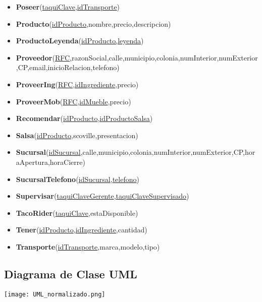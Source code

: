 \documentclass[11pt,letterpaper]{article}
\begin{document}
\begin{itemize}
\item \footnotesize{\textbf{Poseer}(\underline{taquiClave},\underline{idTransporte})}
\item \footnotesize{\textbf{Producto}(\underline{idProducto},nombre,precio,descripcion)}
\item \footnotesize{\textbf{ProductoLeyenda}(\underline{idProducto,leyenda})}
\item \scriptsize{\textbf{Proveedor}(\underline{RFC},razonSocial,calle,municipio,colonia,numInterior,numExterior,CP,email,inicioRelacion,telefono)}
\item \footnotesize{\textbf{ProveerIng}(\underline{RFC},\underline{idIngrediente},precio)}
\item \footnotesize{\textbf{ProveerMob}(\underline{RFC},\underline{idMueble},precio)}
\item \footnotesize{\textbf{Recomendar}(\underline{idProducto},\underline{idProductoSalsa})}
\item \footnotesize{\textbf{Salsa}(\underline{idProducto},scoville,presentacion)}
\item {\footnotesize \textbf{Sucursal}(\underline{idSucursal},calle,municipio,colonia,numInterior,numExterior,CP,horaApertura,horaCierre)}
\item \footnotesize{\textbf{SucursalTelefono}(\underline{idSucursal},\underline{telefono})}
\item \footnotesize{\textbf{Supervisar}(\underline{taquiClaveGerente},\underline{taquiClaveSupervisado})}
\item \footnotesize{\textbf{TacoRider}(\underline{taquiClave},estaDisponible)}
\item \footnotesize{\textbf{Tener}(\underline{idProducto},\underline{idIngrediente},cantidad)}
\item \footnotesize{\textbf{Transporte}(\underline{idTransporte},marca,modelo,tipo)}

\end{itemize}
\subsection{Diagrama de Clase UML}

 \begin{landscape}
\begin{center}
\begin{minipage}{1\linewidth}
\texttt{[image: UML\_normalizado.png]}
\end{minipage}
\end{center}
\end{landscape}
\end{document}
